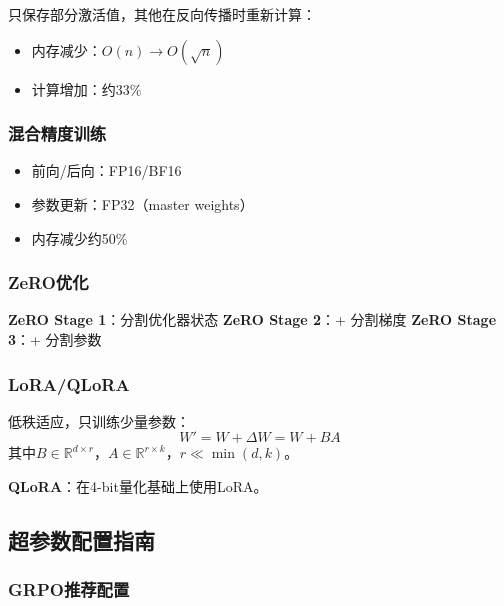 \documentclass[12pt,a4paper]{article}
\begin{document}
只保存部分激活值，其他在反向传播时重新计算：
\begin{itemize}
    \item 内存减少：$O(n) \rightarrow O(\sqrt{n})$
    \item 计算增加：约33\%
\end{itemize}

\subsubsection{混合精度训练}

\begin{itemize}
    \item 前向/后向：FP16/BF16
    \item 参数更新：FP32（master weights）
    \item 内存减少约50\%
\end{itemize}

\subsubsection{ZeRO优化}

\textbf{ZeRO Stage 1}：分割优化器状态
\textbf{ZeRO Stage 2}：+ 分割梯度
\textbf{ZeRO Stage 3}：+ 分割参数

\subsubsection{LoRA/QLoRA}

低秩适应，只训练少量参数：
\begin{equation}
W' = W + \Delta W = W + BA
\end{equation}
其中$B \in \mathbb{R}^{d \times r}$，$A \in \mathbb{R}^{r \times k}$，$r \ll \min(d, k)$。

\textbf{QLoRA}：在4-bit量化基础上使用LoRA。

\subsection{超参数配置指南}

\subsubsection{GRPO推荐配置}
\end{document}
